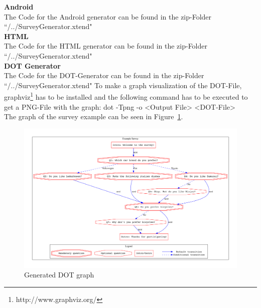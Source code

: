 \documentclass[runningheads,a4paper]{llncs}
\begin{document}
\newpage
\textbf{Android}
\\
The Code for the Android generator can be found in the zip-Folder ``/../SurveyGenerator.xtend"
\\
\textbf{HTML}
\\
The Code for the HTML generator can be found in the zip-Folder ``/../SurveyGenerator.xtend"
\\
\textbf{DOT Generator}
\\
The Code for the DOT-Generator can be found in the zip-Folder ``/../SurveyGenerator.xtend"
To make a graph visualization of the DOT-File, graphviz\footnote{http://www.graphviz.org/} has to be installed and the following command has to be executed to get a PNG-File with the graph:
dot -Tpng -o {\textless}Output File{\textgreater} {\textless}DOT-File{\textgreater}
\\
The graph of the survey example can be seen in Figure~\ref{fig:survey_graph}.

\begin{figure}[htb]
	\centering
	\includegraphics[scale=0.50,angle=270]{images/graph_example_survey}
	\caption{Generated DOT graph}
	\label{fig:survey_graph}
\end{figure}
\end{document}
